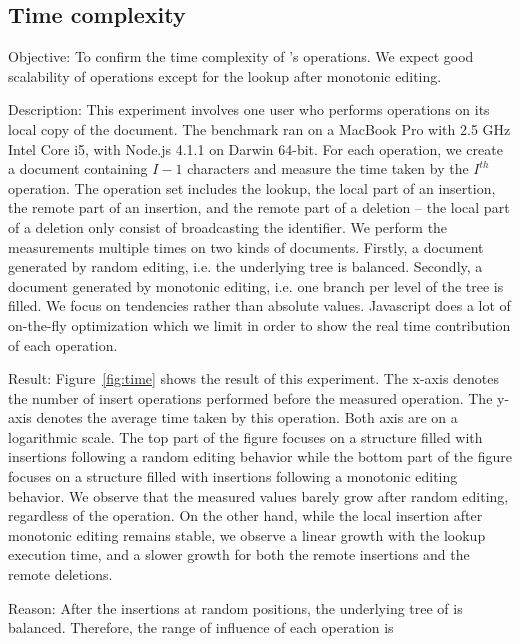 \subsection{Time complexity}


\begin{asparadesc}
\item [Objective:] To confirm the time complexity of \LSEQ's operations. We
  expect good scalability of operations except for the lookup after monotonic
  editing.
\item [Description:] This experiment involves one user who performs operations
  on its local copy of the document. The benchmark ran on a MacBook Pro with 2.5
  GHz Intel Core i5, with Node.js 4.1.1 on Darwin 64-bit. For each operation, we
  create a document containing $I-1$ characters and measure the time taken by
  the $I^{th}$ operation. The operation set includes the lookup, the local part
  of an insertion, the remote part of an insertion, and the remote part of a
  deletion -- the local part of a deletion only consist of broadcasting the
  identifier. We perform the measurements multiple times on two kinds of
  documents. Firstly, a document generated by random editing, i.e. the
  underlying \LSEQ tree is balanced. Secondly, a document generated by monotonic
  editing, i.e. one branch per level of the \LSEQ tree is filled.  We focus on
  tendencies rather than absolute values. Javascript does a lot of on-the-fly
  optimization which we limit in order to show the real time contribution of
  each operation.
\item [Result:] Figure~\ref{fig:time} shows the result of this experiment. The
  x-axis denotes the number of insert operations performed before the measured
  operation. The y-axis denotes the average time taken by this operation. Both
  axis are on a logarithmic scale. The top part of the figure focuses on a
  structure filled with insertions following a random editing behavior while the
  bottom part of the figure focuses on a structure filled with insertions
  following a monotonic editing behavior. We observe that the measured values
  barely grow after random editing, regardless of the operation. On the other
  hand, while the local insertion after monotonic editing remains stable, we
  observe a linear growth with the lookup execution time, and a slower growth
  for both the remote insertions and the remote deletions.
\item [Reason:] After the insertions at random positions, the underlying tree of
  \LSEQ is balanced. Therefore, the range of influence of each operation is

\end{asparadesc}
